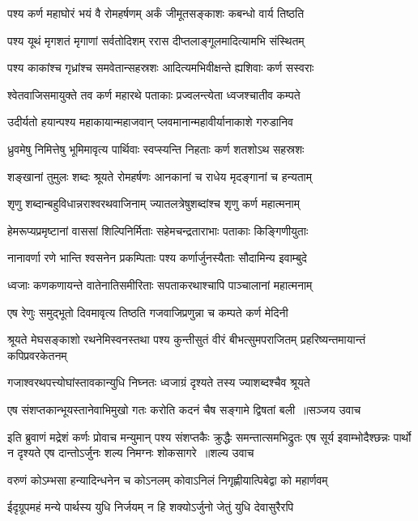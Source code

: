 \twolineshloka
{पश्य कर्ण महाघोरं भयं वै रोमहर्षणम्}
{अर्कं जीमूतसङ्काशः कबन्धो वार्य तिष्ठति}


\twolineshloka
{पश्य यूथं मृगशतं मृगाणां सर्वतोदिशम्}
{ररास दीप्तलाङ्गूलमादित्यामभि संस्थितम्}


\twolineshloka
{पश्य काकांश्च गृध्रांश्च समवेतान्सहस्रशः}
{आदित्यमभिवीक्षन्ते ह्यशिवाः कर्ण सस्वराः}


\twolineshloka
{श्वेतवाजिसमायुक्ते तव कर्ण महारथे}
{पताकाः प्रज्वलन्त्येता ध्वजश्चातीव कम्पते}


\twolineshloka
{उदीर्यतो हयान्पश्य महाकायान्महाजवान्}
{प्लवमानान्महावीर्यानाकाशे गरुडानिव}


\twolineshloka
{ध्रुवमेषु निमित्तेषु भूमिमावृत्य पार्थिवाः}
{स्वप्स्यन्ति निहताः कर्ण शतशोऽथ सहस्रशः}


\twolineshloka
{शङ्खानां तुमुलः शब्दः श्रूयते रोमहर्षणः}
{आनकानां च राधेय मृदङ्गानां च हन्यताम्}


\twolineshloka
{शृणु शब्दान्बहुविधान्नराश्वरथवाजिनाम्}
{ज्यातलत्रेषुशब्दांश्च शृणु कर्ण महात्मनाम्}


\twolineshloka
{हेमरूप्यप्रमृष्टानां वाससां शिल्पिनिर्मिताः}
{सहेमचन्द्रताराभाः पताकाः किङ्गिणीयुताः}


\twolineshloka
{नानावर्णा रणे भान्ति श्वसनेन प्रकम्पिताः}
{पश्य कर्णार्जुनस्यैताः सौदामिन्य इवाम्बुदे}


\twolineshloka
{ध्वजाः कणकणायन्ते वातेनातिसमीरिताः}
{सपताकरथाश्चापि पाञ्चालानां महात्मनाम्}


\twolineshloka
{एष रेणुः समुद्भूतो दिवमावृत्य तिष्ठति}
{गजवाजिप्रणुन्ना च कम्पते कर्ण मेदिनी}


\threelineshloka
{श्रूयते मेघसङ्काशो रथनेमिस्वनस्तथा}
{पश्य कुन्तीसुतं वीरं बीभत्सुमपराजितम्}
{प्रहरिष्यन्तमायान्तं कपिप्रवरकेतनम्}


\twolineshloka
{गजाश्वरथपत्त्योघांस्तावकान्युधि निघ्नतः}
{ध्वजाग्रं दृश्यते तस्य ज्याशब्दश्चैव श्रूयते}


\threelineshloka
{एष संशप्तकान्भूयस्तानेवाभिमुखो गतः}
{करोति कदनं चैष सङ्गामे द्विषतां बली ॥सञ्जय उवाच}
{}


इति ब्रुवाणं मद्रेशं कर्णः प्रोवाच मन्युमान्
\fourlineindentedshloka
{पश्य संशप्तकैः क्रुद्धैः समन्तात्समभिद्रुतः}
{एष सूर्य इवाम्भोदैश्छन्नः पार्थो न दृश्यते}
{एष दान्तोऽर्जुनः शल्य निमग्नः शोकसागरे ॥शल्य उवाच}
{}


\twolineshloka
{वरुणं कोऽम्भसा हन्यादिन्धनेन च कोऽनलम्}
{कोवाऽनिलं निगृह्णीयात्पिबेद्वा को महार्णवम्}


\twolineshloka
{ईदृग्रूपमहं मन्ये पार्थस्य युधि निर्जयम्}
{न हि शक्योऽर्जुनो जेतुं युधि देवासुरैरपि}


